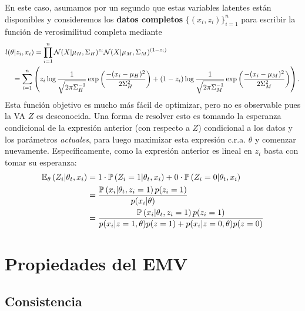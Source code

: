 En este caso, asumamos por un segundo que estas variables latentes están disponibles y consideremos los \textbf{datos completos} $\{(x_i,z_i)\}_{i=1}^n$ para escribir la función de verosimilitud completa mediante
\begin{align*}
	l(\theta|z_i,x_i) &= \prod_{i=1}^n \cN(X|\mu_H,\Sigma_H)^{z_i} \cN(X|\mu_M,\Sigma_M)^{(1-z_i)}\\
	&\hspace{-3em}= \sum_{i=1}^n \left( z_i\log\frac{1}{\sqrt{2\pi\Sigma_H^{-1}}}\expo{\frac{-(x_i-\mu_H)^2}{2\Sigma^2_H}} + (1-z_i)\log\frac{1}{\sqrt{2\pi\Sigma_M^{-1}}}\expo{\frac{-(x_i-\mu_M)^2}{2\Sigma^2_M}}\right).
\end{align*}
Esta función objetivo es mucho más fácil de optimizar, pero no es observable pues la VA $Z$ es desconocida. Una forma de resolver esto es tomando la esperanza condicional de la expresión anterior (con respecto a $Z$) condicional a los datos y los parámetros \textit{actuales}, para luego maximizar esta expresión c.r.a. $\theta$ y comenzar nuevamente. Específicamente, como la expresión anterior es lineal en $z_i$ basta con tomar su esperanza: 
\begin{align*}
	\mathbb{E}_\theta \left(Z_i|\theta_t,x_i\right) &= 1\cdot\mathbb{P} \left(Z_i=1|\theta_t,x_i\right) + 0\cdot\mathbb{P} \left(Z_i=0|\theta_t,x_i\right)\\
	&= 	\frac{\mathbb{P} \left(x_i|\theta_t,z_i=1\right) p(z_i=1)}{p(x_i|\theta)}\\
	&= 	\frac{\mathbb{P} \left(x_i|\theta_t,z_i=1\right) p(z_i=1)}{p(x_i|z=1,\theta)p(z=1)+p(x_i|z=0	,\theta)p(z=0)}
\end{align*}









\section{Propiedades del EMV} 
\label{sec:propiedades_EMV}
\subsection{Consistencia} 

